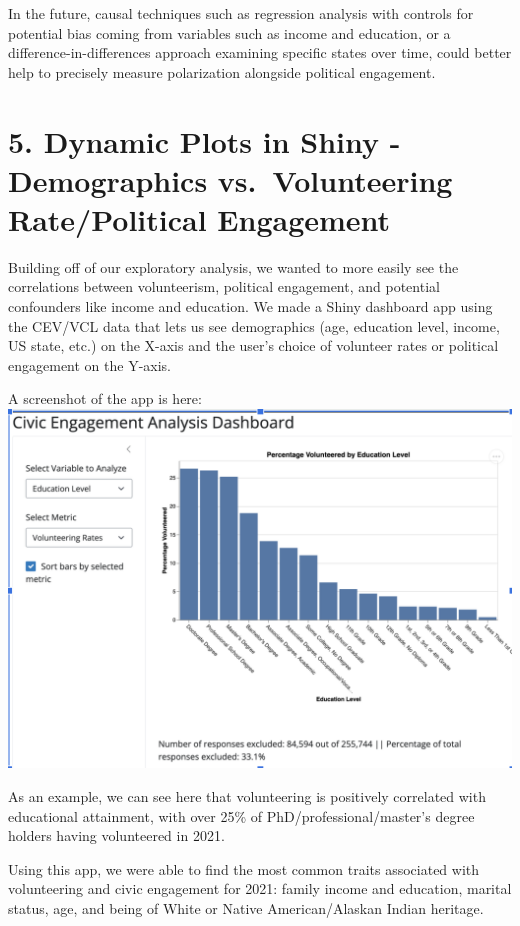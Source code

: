 \documentclass[
  letterpaper,
  DIV=11,
  numbers=noendperiod]{scrartcl}
\begin{document}
In the future, causal techniques such as regression analysis with
controls for potential bias coming from variables such as income and
education, or a difference-in-differences approach examining specific
states over time, could better help to precisely measure polarization
alongside political engagement.

\section{5. Dynamic Plots in Shiny - Demographics vs.~Volunteering
Rate/Political
Engagement}\label{dynamic-plots-in-shiny---demographics-vs.-volunteering-ratepolitical-engagement}

Building off of our exploratory analysis, we wanted to more easily see
the correlations between volunteerism, political engagement, and
potential confounders like income and education. We made a Shiny
dashboard app using the CEV/VCL data that lets us see demographics (age,
education level, income, US state, etc.) on the X-axis and the user's
choice of volunteer rates or political engagement on the Y-axis.

A screenshot of the app is here: \includegraphics{shiny_screenshot.png}

As an example, we can see here that volunteering is positively
correlated with educational attainment, with over 25\% of
PhD/professional/master's degree holders having volunteered in 2021.

Using this app, we were able to find the most common traits associated
with volunteering and civic engagement for 2021: family income and
education, marital status, age, and being of White or Native
American/Alaskan Indian heritage.
\end{document}
